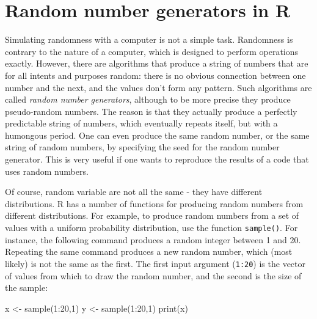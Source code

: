 \documentclass[
  letterpaper,
  DIV=11,
  numbers=noendperiod]{scrreprt}
\newenvironment{Shaded}{\begin{snugshade}}{\end{snugshade}}
\newcommand{\DecValTok}[1]{\textcolor[rgb]{0.68,0.00,0.00}{#1}}
\newcommand{\FunctionTok}[1]{\textcolor[rgb]{0.28,0.35,0.67}{#1}}
\newcommand{\NormalTok}[1]{\textcolor[rgb]{0.00,0.23,0.31}{#1}}
\newcommand{\OtherTok}[1]{\textcolor[rgb]{0.00,0.23,0.31}{#1}}
\newcommand{\SpecialCharTok}[1]{\textcolor[rgb]{0.37,0.37,0.37}{#1}}
\begin{document}
\hypertarget{random-number-generators-in-r}{%
\section{Random number generators in
R}\label{random-number-generators-in-r}}

\label{sec:comp4}

Simulating randomness with a computer is not a simple task. Randomness
is contrary to the nature of a computer, which is designed to perform
operations exactly. However, there are algorithms that produce a string
of numbers that are for all intents and purposes random: there is no
obvious connection between one number and the next, and the values don't
form any pattern. Such algorithms are called \emph{random number
generators}, although to be more precise they produce pseudo-random
numbers. The reason is that they actually produce a perfectly
predictable string of numbers, which eventually repeats itself, but with
a humongous period. One can even produce the same random number, or the
same string of random numbers, by specifying the seed for the random
number generator. This is very useful if one wants to reproduce the
results of a code that uses random numbers.

Of course, random variable are not all the same - they have different
distributions. R has a number of functions for producing random numbers
from different distributions. For example, to produce random numbers
from a set of values with a uniform probability distribution, use the
function \texttt{sample()}. For instance, the following command produces
a random integer between 1 and 20. Repeating the same command produces a
new random number, which (most likely) is not the same as the first. The
first input argument (\texttt{1:20}) is the vector of values from which
to draw the random number, and the second is the size of the sample:

\begin{Shaded}
\begin{Highlighting}[]
\NormalTok{x }\OtherTok{\textless{}{-}} \FunctionTok{sample}\NormalTok{(}\DecValTok{1}\SpecialCharTok{:}\DecValTok{20}\NormalTok{,}\DecValTok{1}\NormalTok{)}
\NormalTok{y }\OtherTok{\textless{}{-}} \FunctionTok{sample}\NormalTok{(}\DecValTok{1}\SpecialCharTok{:}\DecValTok{20}\NormalTok{,}\DecValTok{1}\NormalTok{)}
\FunctionTok{print}\NormalTok{(x)}
\end{Highlighting}
\end{Shaded}
\end{document}
